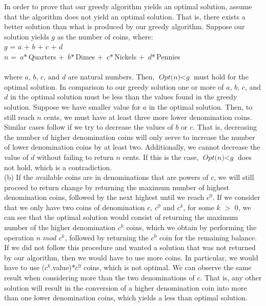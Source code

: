 \documentclass[]{report}
\begin{document}
\begin{enumerate}
	In order to prove that our greedy algorithm yields an optimal solution, assume that the algorithm does not yield an optimal solution. That is, there exists a better solution than what is produced by our greedy algorithm. Suppose our solution yields $\textit{g}$ as the number of coins, where: \\ 
	$ \textit{g} $ = $ \textit{a} $ + $ \textit{b} $ + $ \textit{c} $ + $ \textit{d} $ \\
	 $\textit{n}$ = $\textit{a}*$Quarters + $\textit{b}*$Dimes + $\textit{c}*$Nickels + $\textit{d}*$Pennies\\ \\
	 where $\textit{a}$, $\textit{b}$, $\textit{c}$, and $\textit{d}$ are natural numbers. Then, $ \textit{Opt(n)} <  \textit{g}$ must hold for the optimal solution. In comparison to our greedy solution one or more of $\textit{a}$, $\textit{b}$, $\textit{c}$, and $\textit{d}$ in the optimal solution must be less than the values found in the greedy solution. Suppose we have smaller value for $\textit{a}$ in the optimal solution. Then, to still reach $\textit{n}$ cents, we must have at least three more lower denomination coins. Similar cases follow if we try to decrease the values of $ \textit{b} $ or $ \textit{c} $. That is, decreasing the number of higher denomination coins will only serve to increase the number of lower denomination coins by at least two. Additionally, we cannot decrease the value of $ \textit{d} $ without failing to return $ \textit{n} $ cents.  If this is the case, $ \textit{Opt(n)} <  \textit{g}$ does not hold, which is a contradiction. \\
	 
	(b) If the available coins are in denominations that are powers of $ \textit{c} $, we will still proceed to return change by returning the maximum number of highest denomination coins, followed by the next highest until we reach $ c^{0} $. If we consider that we only have two coins of denomination $ \textit{c} $, $ c^{0} $ and $ c^{k} $, for some $ \textit{k} $ $>$ 0, we can see that the optimal solution would consist of returning the maximum number of  the higher denomination $c^{k}$ coins, which we obtain by performing the operation $ \textit{n} $ $ \textit{mod} $ $c^{k}$, followed by returning the $ c^{0} $ coin for the remaining balance. If we did not follow this procedure and wanted a solution that was not returned by our algorithm, then we would have to use more coins. In particular, we would have to use ($c^{k}$.value)$* c^{0} $ coins, which is not optimal. We can observe the same result when considering more than the two denominations of $ \textit{c} $. That is, any other solution will result in the conversion of a higher denomination coin into more than one lower denomination coins, which yields a less than optimal solution.  \\
	

\end{enumerate}
\end{document}
